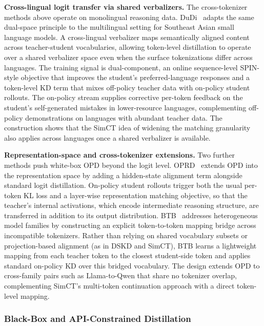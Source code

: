 \documentclass{article} %
\begin{document}
\textbf{Cross-lingual logit transfer via shared verbalizers.} The cross-tokenizer methods above operate on monolingual reasoning data. DuDi~\citep{2606.04694} adapts the same dual-space principle to the multilingual setting for Southeast Asian small language models. A cross-lingual verbalizer maps semantically aligned content across teacher-student vocabularies, allowing token-level distillation to operate over a shared verbalizer space even when the surface tokenizations differ across languages. The training signal is dual-component, an online sequence-level SPIN-style objective that improves the student's preferred-language responses and a token-level KD term that mixes off-policy teacher data with on-policy student rollouts. The on-policy stream supplies corrective per-token feedback on the student's self-generated mistakes in lower-resource languages, complementing off-policy demonstrations on languages with abundant teacher data. The construction shows that the SimCT idea of widening the matching granularity also applies across languages once a shared verbalizer is available.

\textbf{Representation-space and cross-tokenizer extensions.} Two further methods push white-box OPD beyond the logit level. OPRD~\citep{2606.06021} extends OPD into the representation space by adding a hidden-state alignment term alongside standard logit distillation. On-policy student rollouts trigger both the usual per-token KL loss and a layer-wise representation matching objective, so that the teacher's internal activations, which encode intermediate reasoning structure, are transferred in addition to its output distribution. BTB~\citep{2606.09456} addresses heterogeneous model families by constructing an explicit token-to-token mapping bridge across incompatible tokenizers. Rather than relying on shared vocabulary subsets or projection-based alignment (as in DSKD and SimCT), BTB learns a lightweight mapping from each teacher token to the closest student-side token and applies standard on-policy KD over this bridged vocabulary. The design extends OPD to cross-family pairs such as Llama-to-Qwen that share no tokenizer overlap, complementing SimCT's multi-token continuation approach with a direct token-level mapping.

\subsubsection{Black-Box and API-Constrained Distillation}
\label{subsec:black_box}
\end{document}
